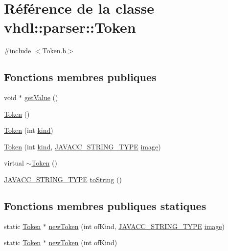 \hypertarget{classvhdl_1_1parser_1_1_token}{}\section{Référence de la classe vhdl\+:\+:parser\+:\+:Token}
\label{classvhdl_1_1parser_1_1_token}


{\ttfamily \#include $<$Token.\+h$>$}

\subsection*{Fonctions membres publiques}
\begin{DoxyCompactItemize}
\item 
void $\ast$ \hyperlink{classvhdl_1_1parser_1_1_token_adf2e437f6aeef2e6d195ebfe51ae2bb0}{get\+Value} ()
\item 
\hyperlink{classvhdl_1_1parser_1_1_token_af4c8d87a0456cd4ce8a65662fa507bb1}{Token} ()
\item 
\hyperlink{classvhdl_1_1parser_1_1_token_a3111dc253c0e2eb0a0cf128914ec4a44}{Token} (int \hyperlink{classvhdl_1_1parser_1_1_token_a021bfae89b9eec39a87db9577508916c}{kind})
\item 
\hyperlink{classvhdl_1_1parser_1_1_token_a3a25de73b579708d1b82f2ad247816d8}{Token} (int \hyperlink{classvhdl_1_1parser_1_1_token_a021bfae89b9eec39a87db9577508916c}{kind}, \hyperlink{_java_c_c_8h_a7941da0682a76ffa9869d8458e166062}{J\+A\+V\+A\+C\+C\+\_\+\+S\+T\+R\+I\+N\+G\+\_\+\+T\+Y\+P\+E} \hyperlink{classvhdl_1_1parser_1_1_token_abafca7a99f0aca2f76d1d9094bf22e9c}{image})
\item 
virtual \hyperlink{classvhdl_1_1parser_1_1_token_a7b2a59d4698406afcbadd03c1a569786}{$\sim$\+Token} ()
\item 
\hyperlink{_java_c_c_8h_a7941da0682a76ffa9869d8458e166062}{J\+A\+V\+A\+C\+C\+\_\+\+S\+T\+R\+I\+N\+G\+\_\+\+T\+Y\+P\+E} \hyperlink{classvhdl_1_1parser_1_1_token_a1642fdaf589e2f0158e101d9a335d75a}{to\+String} ()
\end{DoxyCompactItemize}
\subsection*{Fonctions membres publiques statiques}
\begin{DoxyCompactItemize}
\item 
static \hyperlink{classvhdl_1_1parser_1_1_token}{Token} $\ast$ \hyperlink{classvhdl_1_1parser_1_1_token_af4f2850e46715e5ec1ddd430f9c5aaff}{new\+Token} (int of\+Kind, \hyperlink{_java_c_c_8h_a7941da0682a76ffa9869d8458e166062}{J\+A\+V\+A\+C\+C\+\_\+\+S\+T\+R\+I\+N\+G\+\_\+\+T\+Y\+P\+E} \hyperlink{classvhdl_1_1parser_1_1_token_abafca7a99f0aca2f76d1d9094bf22e9c}{image})
\item 
static \hyperlink{classvhdl_1_1parser_1_1_token}{Token} $\ast$ \hyperlink{classvhdl_1_1parser_1_1_token_ad7dc0d02c87d8c1fc1a31f048b98f188}{new\+Token} (int of\+Kind)
\end{DoxyCompactItemize}
